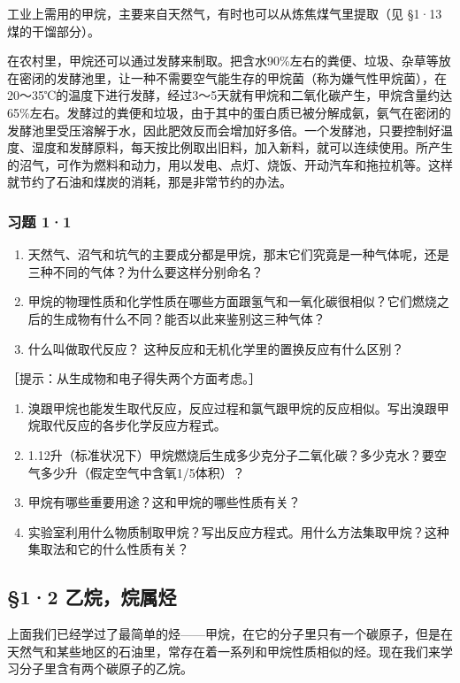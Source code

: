 工业上需用的甲烷，主要来自天然气，有时也可以从炼焦煤气里提取（见 §1·13
煤的干馏部分）。

在农村里，甲烷还可以通过发酵来制取。把含水90\%左右的粪便、垃圾、杂草等放在密闭的发酵池里，让一种不需要空气能生存的甲烷菌（称为嫌气性甲烷菌），在20～35℃的温度下进行发酵，经过3～5天就有甲烷和二氧化碳产生，甲烷含量约达65\%左右。发酵过的粪便和垃圾，由于其中的蛋白质已被分解成氨，氨气在密闭的发酵池里受压溶解于水，因此肥效反而会增加好多倍。一个发酵池，只要控制好温度、湿度和发酵原料，每天按比例取出旧料，加入新料，就可以连续使用。所产生的沼气，可作为燃料和动力，用以发电、点灯、烧饭、开动汽车和拖拉机等。这样就节约了石油和煤炭的消耗，那是非常节约的办法。

\subsubsection{习题 1·1}

\begin{enumerate}
\item
  天然气、沼气和坑气的主要成分都是甲烷，那末它们究竟是一种气体呢，还是三种不同的气体？为什么要这样分别命名？
\item
  甲烷的物理性质和化学性质在哪些方面跟氢气和一氧化碳很相似？它们燃烧之后的生成物有什么不同？能否以此来鉴别这三种气体？
\item
  什么叫做取代反应？ 这种反应和无机化学里的置换反应有什么区别？
\end{enumerate}

［提示：从生成物和电子得失两个方面考虑。］

\begin{enumerate}[start=4]
\item
  溴跟甲烷也能发生取代反应，反应过程和氯气跟甲烷的反应相似。写出溴跟甲烷取代反应的各步化学反应方程式。
\item
  1.12升（标准状况下）甲烷燃烧后生成多少克分子二氧化碳？多少克水？要空气多少升（假定空气中含氧1/5体积）？
\item
  甲烷有哪些重要用途？这和甲烷的哪些性质有关？
\item
  实验室利用什么物质制取甲烷？写出反应方程式。用什么方法集取甲烷？这种集取法和它的什么性质有关？
\end{enumerate}

\subsection{§1·2 乙烷，烷属烃}

上面我们已经学过了最简单的烃------甲烷，在它的分子里只有一个碳原子，但是在天然气和某些地区的石油里，常存在着一系列和甲烷性质相似的烃。现在我们来学习分子里含有两个碳原子的乙烷。

